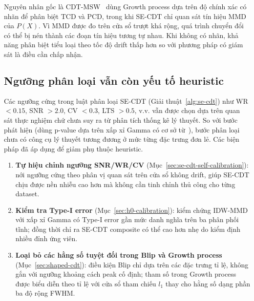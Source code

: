 Nguyên nhân gốc là CDT-MSW~\cite{guo2022cdtmsw} dùng Growth process dựa trên độ chính xác có nhãn để phân biệt TCD và PCD, trong khi SE-CDT chỉ quan sát tín hiệu MMD của $P(X)$. Vì MMD được đo trên cửa sổ trượt khá rộng, quá trình chuyển đổi có thể bị nén thành các đoạn tín hiệu tương tự nhau. Khi không có nhãn, khả năng phân biệt tiểu loại theo tốc độ drift thấp hơn so với phương pháp có giám sát là điều cần chấp nhận.

\subsection{Ngưỡng phân loại vẫn còn yếu tố heuristic}
\label{sec:limitation-heuristic}
Các ngưỡng cứng trong luật phân loại SE-CDT (Giải thuật~\ref{alg:se-cdt}) như WR $< 0.15$, SNR $> 2.0$, CV $< 0.3$, LTS $> 0.5$, v.v. vẫn được chọn dựa trên quan sát thực nghiệm chứ chưa suy ra từ phân tích thống kê lý thuyết. So với bước phát hiện (dùng p-value dựa trên xấp xỉ Gamma có cơ sở từ~\cite{gretton2009gamma}), bước phân loại chưa có công cụ lý thuyết tương đương ở mức từng đặc trưng đơn lẻ. Các biện pháp đã áp dụng để giảm phụ thuộc heuristic.
\begin{enumerate}
	\item \textbf{Tự hiệu chỉnh ngưỡng SNR/WR/CV} (Mục~\ref{sec:se-cdt-self-calibration}): nới ngưỡng cứng theo phân vị quan sát trên cửa sổ không drift, giúp SE-CDT chịu được nền nhiễu cao hơn mà không cần tinh chỉnh thủ công cho từng dataset.
	\item \textbf{Kiểm tra Type-I error} (Mục~\ref{sec:h0-calibration}): kiểm chứng IDW-MMD với xấp xỉ Gamma có Type-I error gần mức danh nghĩa trên ba phân phối tĩnh; đồng thời chỉ ra SE-CDT composite có thể cao hơn nhẹ do kiểm định nhiều đỉnh ứng viên.
	\item \textbf{Loại bỏ các hằng số tuyệt đối trong Blip và Growth process} (Mục~\ref{sec:shaped-cdt}): điều kiện Blip chỉ dựa trên các đặc trưng tỉ lệ, không gắn với ngưỡng khoảng cách peak cố định; tham số trong Growth process được biểu diễn theo tỉ lệ với cửa sổ tham chiếu $l_1$ thay cho hằng số dạng phần ba độ rộng FWHM.
\end{enumerate}

